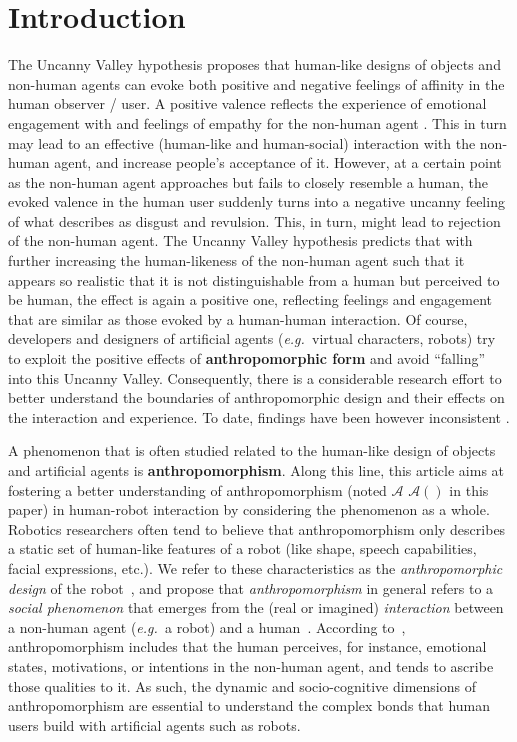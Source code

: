 \documentclass{frontiersSCNS} %
\newcommand{\eg}{{\textit{e.g.~}}}
\newcommand{\Ant}[1][]{%
      \ifthenelse{\isempty{#1}}%
        {$\mathcal{A}$}
        {$\mathcal{A}(#1)$}
}
\begin{document}
\section{Introduction}
\label{sec:intro}

The Uncanny Valley hypothesis \citep{mori_uncanny_1970} proposes that human-like
designs of objects and non-human agents can evoke both positive and negative feelings 
of affinity in the human observer / user. A positive valence reflects the experience of 
emotional engagement with and feelings of empathy for the non-human agent
\citep{cheetham_human_2011}. This in turn may lead to an effective (human-like and 
human-social) interaction with the non-human agent, and increase people's acceptance of
it. 
However, at a certain point as the non-human agent
approaches but fails to closely resemble a human, the evoked valence in the
human user suddenly turns into a negative uncanny feeling of what
\cite{mori_uncanny_1970} describes as disgust and revulsion. This, in turn,
might lead to rejection of the non-human agent. The Uncanny
Valley hypothesis predicts that with further increasing the human-likeness of
the non-human agent such that it appears so realistic that it is not
distinguishable from a human but perceived to be human, the effect is again a
positive one, reflecting feelings and engagement that are similar as those
evoked by a human-human interaction. 
Of course, developers and designers of artificial agents
(\eg virtual characters, robots) try to exploit the positive effects of 
\textbf{anthropomorphic form} and avoid ``falling'' into this Uncanny Valley.
Consequently, there is a considerable research effort to
better understand the boundaries of anthropomorphic design and their effects
on the interaction and experience. To date, findings have been however
inconsistent \citep{cheetham_human_2011}.

A phenomenon that is often studied related to the human-like design of objects and 
artificial agents is \textbf{anthropomorphism}.
Along this line, this article aims at fostering a better understanding of
anthropomorphism (noted \Ant in this paper) in human-robot interaction 
by considering the phenomenon
as a whole. Robotics researchers often tend to believe that
anthropomorphism only describes a static set of human-like features of a robot
(like shape, speech capabilities, facial expressions, etc.). We refer to these
characteristics as the \emph{anthropomorphic design} of the
robot~\citep{fink_anthropomorphism_2012}, and propose that \emph{anthropomorphism} in 
general refers to a \emph{social phenomenon} that emerges from the (real or
imagined) \emph{interaction} between a non-human agent (\eg a robot) and a 
human~\citep{persson_anthropomorphism_2000}. According to~\cite{epley_when_2008},
anthropomorphism includes that the human perceives, for instance, emotional states, motivations, or 
intentions in the non-human agent, and tends to ascribe those qualities to it.
As such, the dynamic and
socio-cognitive dimensions of anthropomorphism are essential to understand the
complex bonds that human users build with artificial agents such as robots.
\end{document}
